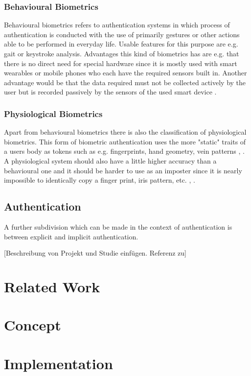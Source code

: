 \subsubsection{Behavioural Biometrics} Behavioural biometrics refers to authentication systems in which process of authentication is conducted with the use of primarily gestures or other actions able to be performed in everyday life. Usable features for this purpose are e.g. gait or keystroke analysis. Advantages this kind of biometrics has are e.g. that there is no direct need for special hardware since it is mostly used with smart wearables or mobile phones who each have the required sensors built in. Another advantage would be that the data required must not be collected actively by the user but is recorded passively by the sensors of the used smart device \cite{yampolskiy2008behavioural}.
\subsubsection{Physiological Biometrics} Apart from behavioural biometrics there is also the classification of physiological biometrics. This form of biometric authentication uses the more "static" traits of a users body as tokens such as e.g. fingerprints, hand geometry, vein patterns \cite{alsaadi2015physiological}, \cite{faltaous2019vpid}. A physiological system should also have a little higher accuracy than a behavioural one and it should be harder to use as an imposter since it is nearly impossible to identically copy a finger print, iris pattern, etc. \cite{koong2014user}, \cite{delac2004survey}.

\subsection{Authentication}A further subdivision which can be made in the context of authentication is between explicit and implicit authentication.


[Beschreibung von Projekt und Studie einfügen. Referenz zu]

   
\section{Related Work}

\section{Concept}
\section{Implementation}

